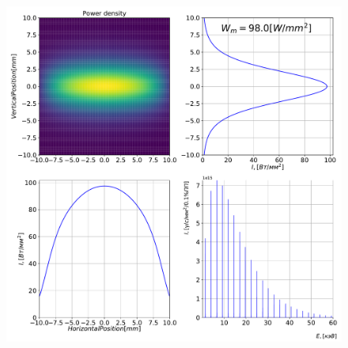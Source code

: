 \documentclass[14pt, hyperref = {colorlinks},xcolor=table ]{beamer}
\begin{document}
\begin{frame}
\begin{figure}[h]
\begin{minipage}[h]{0.49\linewidth}
	\raggedright{\includegraphics[width=1.05\linewidth]{pic/power_dens_1-1.pdf}}
	\vspace{-15pt}	
	\tiny{}
\end{minipage}

\end{figure}

\end{frame}
\fi
\end{document}
